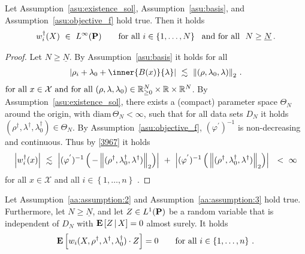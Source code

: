 \begin{lemma}
  \label{weights_l_inf}
  Let Assumption~\ref{asu:existence_sol}, 
  Assumption~\ref{asu:basis},
  and Assumption~\ref{asu:objective_f} hold true.
  Then it holds 
  \begin{gather*}
    w_i^\dagger(X)
  \ 
  \in
  \ 
  L^\infty(\P)
  \qquad
  \text{for all}
  \ 
  i\in \left\{ 1,\ldots,N \right\}
  \ 
  \text{
    and
  for all 
  }\ 
  N\ge \underline{N}
  \,.
  \end{gather*}
\end{lemma}
\begin{proof}
  Let $N\ge \underline{N}$.
  By Assumption~\ref{asu:basis} it holds 
  $
    \text{for all}\ 
  $ 
  \begin{gather}
    \label{3967}
    \left| 
     \rho_i 
     +
      \lambda_0
      +
      \inner{B(x)}{\lambda}
    \right|
    \ 
    \lesssim
    \ 
    \norm{(\rho,\lambda_0,\lambda)}_2
    \,.
  \end{gather}
  $
    \text{for all}
    \ 
    x\in\mathcal{X}
    \
    \text{and for all}\ 
    (\rho,\lambda,\lambda_0)
    \in
  \R^N_{\ge 0}
  \times
  \R
  \times
  \R^{N}
  $.
  By Assumption~\ref{asu:existence_sol}, 
  there exists a (compact) parameter space
  $\Theta_N$ around the origin, with $\mathrm{diam}\,  \Theta_N<\infty$, 
  such that for all data sets $D_N$ it holds  $(\rho^\dagger,\lambda^\dagger,\lambda_0^\dagger)\in\Theta_N$.
  By Assumption~\ref{asu:objective_f}, $(\varphi^{'})^{-1}$ is non-decreasing and continuous. Thus
    by \eqref{3967} it holds
  \begin{align*}
    \left| 
    w_i^\dagger(x)
    \right|
    \ 
    \lesssim
    \ 
    \left| 
    (\varphi^{'})^{-1}
    \left( 
      \,
      -
    \norm{(\rho^\dagger,\lambda_0^\dagger,\lambda^\dagger)}_2
    \right)
    \right|
    \ 
    +
    \ 
    \left| 
    (\varphi^{'})^{-1}
    \left( 
      \,
    \norm{(\rho^\dagger,\lambda_0^\dagger,\lambda^\dagger)}_2
    \right)
    \right|
    \ 
    \ 
    <
    \ 
    \infty
  \end{align*}
  for all $x\in\mathcal{X}$
  and all $i\in \left\{ 1,\ldots,n \right\}$
  .
\end{proof}
\begin{lemma}
  \label{w.Z=0}
  Let Assumption~\ref{aa:assumption:2} and Assumption~\ref{aa:assumption:3} hold true.
  Furthermore, 
  let
  $N\ge\underline{N}$, and
  let
  $Z\in L^1(\P)$
  be a random variable that is independent of $D_N$ 
  with
  $
\E
\left[
  Z
  \,
  |
  \, 
  X
\right]
= 0
  $
  almost surely.
  It holds
  \begin{gather*}
  \E
  \left[
  w_i(X,\rho^\dagger,\lambda^\dagger,\lambda_0^\dagger)
  \cdot Z
  \right]
  =0
  \qquad
  \text{for all}
  \ 
  i\in \left\{ 1,\ldots,n \right\}
  \,.
  \end{gather*}
\end{lemma}
